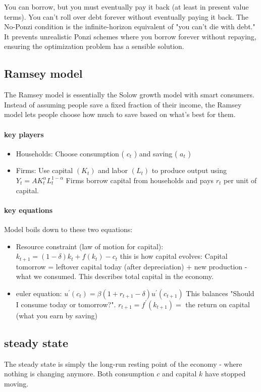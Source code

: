 \documentclass[12pt]{article}
\begin{document}
You can borrow, but you must eventually pay it back (at least in present value terms). You can't roll over debt forever without eventually paying it back. The No-Ponzi condition is the infinite-horizon equivalent of "you can't die with debt." It prevents unrealistic Ponzi schemes where you borrow forever without repaying, ensuring the optimization problem has a sensible solution.
\subsection{Ramsey model}
The Ramsey model is essentially the Solow growth model with smart consumers. Instead of assuming people save a fixed fraction of their income, the Ramsey model lets people choose how much to save based on what's best for them.

\paragraph{key players}
\begin{itemize}
    \item Households: Choose consumption ( $c_t$ ) and saving ( $a_t$ )
    \item Firms: Use capital $\left(K_t\right)$ and labor $\left(L_t\right)$ to produce output using $Y_t=A K_t^\alpha L_t^{1-\alpha}$ Firms borrow capital from households and pays $r_t$ per unit of capital. 
\end{itemize}
\paragraph{key equations} Model boils down to these two equations:
\begin{itemize}
    \item Resource constraint (law of motion for capital): $k_{t+1}=(1-\delta) k_t+f\left(k_t\right)-c_t$ this is how capital evolves: Capital tomorrow = leftover capital today (after depreciation) + new production - what we consumed. This describes total capital in the economy.
    \item euler equation: $u^{\prime}\left(c_t\right)=\beta\left(1+r_{t+1}-\delta\right) u^{\prime}\left(c_{t+1}\right)$ This balances "Should I consume today or tomorrow?". $r_{t+1}=f^{\prime}\left(k_{t+1}\right)=$ the return on capital (what you earn by saving)
\end{itemize}
\subsection{steady state}
The steady state is simply the long-run resting point of the economy - where nothing is changing anymore. Both consumption $c$ and capital $k$ have stopped moving. 
\end{document}
